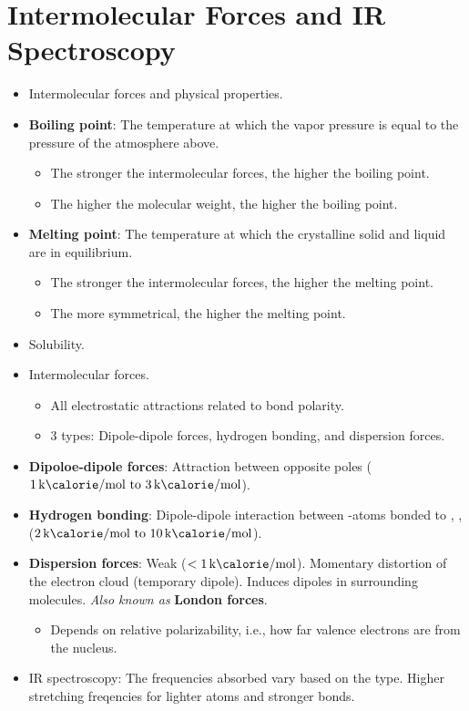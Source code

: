 \documentclass[../notes.tex]{subfiles}
\begin{document}
\section{Intermolecular Forces and IR Spectroscopy}
\begin{itemize}
    \item {}Intermolecular forces and physical properties.
    \item \textbf{Boiling point}: The temperature at which the vapor pressure is equal to the pressure of the atmosphere above.
    \begin{itemize}
        \item The stronger the intermolecular forces, the higher the boiling point.
        \item The higher the molecular weight, the higher the boiling point.
    \end{itemize}
    \item \textbf{Melting point}: The temperature at which the crystalline solid and liquid are in equilibrium.
    \begin{itemize}
        \item The stronger the intermolecular forces, the higher the melting point.
        \item The more symmetrical, the higher the melting point.
    \end{itemize}
    \item Solubility.
    \item Intermolecular forces.
    \begin{itemize}
        \item All electrostatic attractions related to bond polarity.
        \item 3 types: Dipole-dipole forces, hydrogen bonding, and dispersion forces.
    \end{itemize}
    \item \textbf{Dipoloe-dipole forces}: Attraction between opposite poles ($\SIrange[per-mode=symbol]{1}{3}{\kilo\calorie\per\mole}$).
    \item \textbf{Hydrogen bonding}: Dipole-dipole interaction between -atoms bonded to , ,  ($\SIrange[per-mode=symbol]{2}{10}{\kilo\calorie\per\mole}$).
    \item \textbf{Dispersion forces}: Weak ($<\SI[per-mode=symbol]{1}{\kilo\calorie\per\mole}$). Momentary distortion of the electron cloud (temporary dipole). Induces dipoles in surrounding molecules. \emph{Also known as} \textbf{London forces}.
    \begin{itemize}
        \item Depends on relative polarizability, i.e., how far valence electrons are from the nucleus.
    \end{itemize}
    \item IR spectroscopy: The frequencies absorbed vary based on the type. Higher stretching freqencies for lighter atoms and stronger bonds.
\end{itemize}
\end{document}
